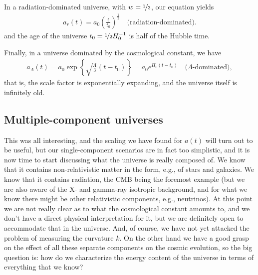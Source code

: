 In a radiation-dominated universe, with $w = \nicefrac{1}{3}$, our equation yields
\begin{align}
  a_r(t) = a_0 \left( \frac{t}{t_0} \right)^\frac{1}{2}
  \quad\text{(radiation-dominated)}.
\end{align}
and the age of the universe $t_0 = \nicefrac{1}{2} H_0^{-1}$ is half of the Hubble
time.

Finally, in a universe dominated by the cosmological constant, we have
\begin{align}
  a_\Lambda(t) = a_0 \exp\left \{ \sqrt{\frac{\Lambda}{3}} (t - t_0) \right\} =
  a_0 e^{H_0 (t - t_0)}
  \quad \text{(}\Lambda\text{-dominated)},
\end{align}
that is, the scale factor is exponentially expanding, and the universe itself
is infinitely old.



\subsection{Multiple-component universes}

This was all interesting, and the scaling we have found for $a(t)$ will turn out to
be useful, but our single-component scenarios are in fact too simplistic, and it is
now time to start discussing what the universe is really composed of. We know that
it contains non-relativistic matter in the form, e.g., of stars and galaxies. We know
that it contains radiation, the CMB being the foremost example (but we are also
aware of the X- and gamma-ray isotropic background, and for what we know there might
be other relativistic components, e.g., neutrinos). At this point we are not really
clear as to what the cosmological constant amounts to, and we don't have a direct
physical interpretation for it, but we are definitely open to accommodate that in the
universe. And, of course, we have not yet attacked the problem of measuring the
curvature $k$. On the other hand we have a good grasp on the effect of all these
separate components on the cosmic evolution, so the big question is: how do we
characterize the energy content of the universe in terms of everything that we know?

